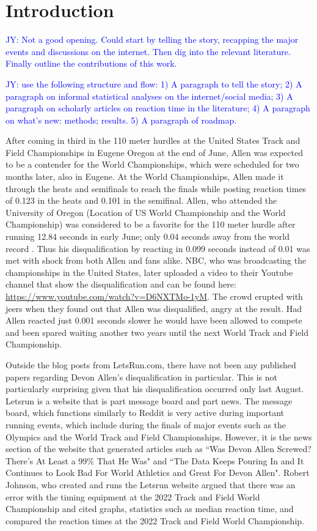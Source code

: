 \documentclass[12pt, letterpaper, titlepage]{article}
\newcommand{\jy}[1]{\textcolor{blue}{JY: #1}}
\begin{document}
\section{Introduction}
\label{sec:intro}


\jy{Not a good opening. Could start by telling the story, recapping the major
  events and discussions on the internet. Then dig into the relevant
  literature. Finally outline the contributions of this work.
}


\jy{use the following structure and flow:
  1) A paragraph to tell the story;
  2) A paragraph on informal statistical analyses on the internet/social media;
  3) A paragraph on scholarly articles on reaction time in the literature;
  4) A paragraph on what's new: methods; results.
  5) A paragraph of roadmap.}


After coming in third in the 110 meter hurdles at the United States Track and 
Field Championships in Eugene Oregon at the end of June, Allen was expected to 
be a contender for the World Championships, which were scheduled for two months 
later, also in Eugene. At the World Championships, Allen made it through the 
heats and semifinals to reach the finals while posting reaction times of 0.123
in the heats and 0.101 in the semifinal.  Allen, who attended the University
of Oregon (Location of US World Championship and the World Championship) was
considered to be a favorite for the 110 meter hurdle after running 12.84 seconds
in early June; only 0.04 seconds away from the world record \citep{Preview}.
Thus his disqualification by reacting in 0.099 seconds instead of 0.01 was met
with shock from both Allen and fans alike.  NBC, who was broadcasting the
championships in the United States, later uploaded a video to their Youtube
channel that show the disqualification and can be found here:
\url{https://www.youtube.com/watch?v=D6NXTMo-1yM}. The crowd erupted with jeers when
they found out that Allen was disqualified, angry at the result.  Had Allen 
reacted just 0.001 seconds slower he would have been allowed to compete and been 
spared waiting another two years until the next World Track and Field Championship.

Outside the blog posts from LetsRun.com, there have not been any published
papers regarding Devon Allen's disqualification in particular.  This is not
particularly surprising given that his disqualification occurred only last August.
Letsrun is a website that is part message board and part news.  The message board,
which functions similarly to Reddit is very active during important running
events, which include during the finals of major events such as
the Olympics and the World Track and Field Championships.  However, it is the
news section of the website that generated articles such as ``Was Devon Allen
Screwed? There's At Least a 99\% That He Was" and ``The Data Keeps Pouring In and
It Continues to Look Bad For World Athletics and Great For Devon Allen".  Robert
Johnson, who created and runs the Letsrun website argued that there was an error
with the timing equipment at the 2022 Track and Field World Championship and
cited graphs, statistics such as median reaction time, and compared the reaction
times at the 2022 Track and Field World Championship.  
\end{document}
